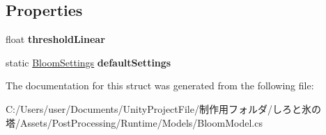 \subsection*{Properties}
\begin{DoxyCompactItemize}
\item 
\mbox{\label{struct_unity_engine_1_1_post_processing_1_1_bloom_model_1_1_bloom_settings_a7f6ebd042c6cad8cad0eb684f4b0a148}} 
float {\bfseries threshold\+Linear}
\item 
\mbox{\label{struct_unity_engine_1_1_post_processing_1_1_bloom_model_1_1_bloom_settings_addcdcbd0f26e700c1857b06be41e462b}} 
static \hyperlink{struct_unity_engine_1_1_post_processing_1_1_bloom_model_1_1_bloom_settings}{Bloom\+Settings} {\bfseries default\+Settings}
\end{DoxyCompactItemize}


The documentation for this struct was generated from the following file\+:\begin{DoxyCompactItemize}
\item 
C\+:/\+Users/user/\+Documents/\+Unity\+Project\+File/制作用フォルダ/しろと氷の塔/\+Assets/\+Post\+Processing/\+Runtime/\+Models/Bloom\+Model.\+cs\end{DoxyCompactItemize}
